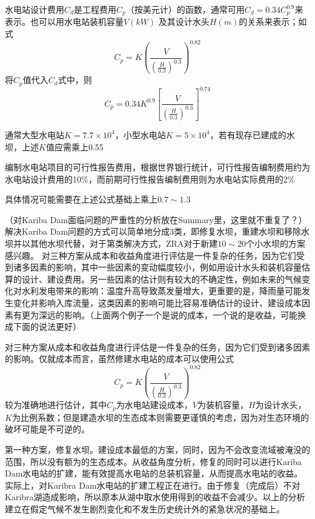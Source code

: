\documentclass{article}
\begin{document}
水电站设计费用$C_{d}$是工程费用$C_{p}$（按美元计）的函数，通常可用$C_{d} = 0.34C_{p}^{0.9}$来表示。也可以用水电站装机容量$V(kW)$ 及其设计水头$H(m)$的关系来表示；如式
\[C_{p} = K\left(\frac{V}{\left(\frac{H}{0.3}\right)^{0.3}}\right)^{0.82}\]
将$C_{p}$值代入$C_{d}$式中，则
\[C_{p} = 0.34K^{0.9}\left[\frac{V}{\left(\frac{H}{0.3}\right)^{0.3}}\right]^{0.74}\]

通常大型水电站$K = 7.7\times10^{4}$，小型水电站$K = 5 \times 10^{4}$，若有现存已建成的水坝，上述$K$值应需乘上0.55

编制水电站项目的可行性报告费用，根据世界银行统计，可行性报告编制费用约为水电站设计费用的10\%，而前期可行性报告编制费用则为水电站实际费用的2\%

具体情况可能需要在上述公式基础上乘上$0.7\sim1.3$


（对Kariba Dam面临问题的严重性的分析放在Summary里，这里就不重复了？）解决Kariba Dam问题的方式可以简单地分成3类，即修复水坝，重建水坝和移除水坝并以其他水坝代替，对于第类解决方式，ZRA对于新建$10\sim20$个小水坝的方案感兴趣。
对三种方案从成本和收益角度进行评估是一件复杂的任务，因为它们受到诸多因素的影响，其中一些因素的变动幅度较小，例如用设计水头和装机容量估算的设计、建设费用。另一些因素的估计则有较大的不确定性，例如未来的气候变化对水利发电带来的影响：温度升高导致蒸发量增大，更重要的是，降雨量可能发生变化并影响入库流量，这类因素的影响可能比容易准确估计的设计、建设成本因素有更为深远的影响。（上面两个例子一个是说的成本，一个说的是收益，可能换成下面的说法更好）

对三种方案从成本和收益角度进行评估是一件复杂的任务，因为它们受到诸多因素的影响。仅就成本而言，虽然修建水电站的成本可以使用公式
\[C_{p} = K\left(\frac{V}{\left(\frac{H}{0.3}\right)^{0.3}}\right)^{0.82}\]
较为准确地进行估计，其中$C_{p}$为水电站建设成本，$V$为装机容量，$H$为设计水头，$K$为比例系数；但是建造水坝的生态成本则需要更谨慎的考虑，因为对生态环境的破坏可能是不可逆的。

第一种方案，修复水坝。建设成本最低的方案，同时，因为不会改变流域被淹没的范围，所以没有额为的生态成本。从收益角度分析，修复的同时可以进行Kariba Dam水电站的扩建，能有效提高水电站的总装机容量，从而提高水电站的收益。实际上，对Karibra Dam水电站的扩建工程正在进行。由于修复（完成后）不对Karibra湖造成影响，所以原本从湖中取水使用得到的收益不会减少。以上的分析建立在假定气候不发生剧烈变化和不发生历史统计外的紧急状况的基础上。
\end{document}
